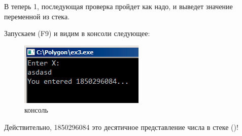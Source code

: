 В \EAX теперь 1, последующая проверка пройдет как надо, и \printf выведет значение переменной из стека.

Запускаем (F9) и видим в консоли следующее:

\begin{figure}[H]
\centering
\includegraphics[scale=\FigScale]{patterns/04_scanf/3_checking_retval/olly_3.png}
\caption{консоль}
\end{figure}

Действительно, 1850296084 это десятичное представление числа в стеке ()!
